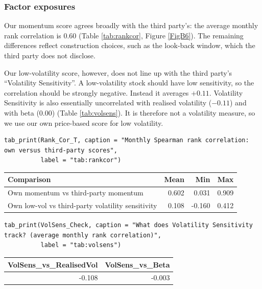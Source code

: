 \documentclass[11pt,preprint]{elsarticle}
\let\origtable\table
\let\endorigtable\endtable
\renewenvironment{table}[1][2] {
    \expandafter\origtable\expandafter[H]
} {
    \endorigtable
}
\numberwithin{equation}{section}
\numberwithin{figure}{section}
\numberwithin{table}{section}
\begin{document}
\subsubsection{Factor exposures}\label{factor-exposures}

Our momentum score agrees broadly with the third party's: the average
monthly rank correlation is 0.60 (Table \ref{tab:rankcor}, Figure
\ref{FigB6}). The remaining differences reflect construction choices,
such as the look-back window, which the third party does not disclose.

Our low-volatility score, however, does not line up with the third
party's ``Volatility Sensitivity''. A low-volatility stock should have
low sensitivity, so the correlation should be strongly negative. Instead
it averages \(+0.11\). Volatility Sensitivity is also essentially
uncorrelated with realised volatility (\(-0.11\)) and with beta (0.00)
(Table \ref{tab:volsens}). It is therefore not a volatility measure, so
we use our own price-based score for low volatility.

\begin{verbatim}
tab_print(Rank_Cor_T, caption = "Monthly Spearman rank correlation: own versus third-party scores",
          label = "tab:rankcor")
\end{verbatim}

\begin{table}[!htbp]
\centering
\caption{Monthly Spearman rank correlation: own versus third-party scores} 
\label{tab:rankcor}
\begingroup\footnotesize
\begin{tabular}{lrrr}
  \hline
Comparison & Mean & Min & Max \\ 
  \hline
Own momentum vs third-party momentum & 0.602 & 0.031 & 0.909 \\ 
  Own low-vol vs third-party volatility sensitivity & 0.108 & -0.160 & 0.412 \\ 
   \hline
\end{tabular}
\endgroup
\end{table}

\begin{verbatim}
tab_print(VolSens_Check, caption = "What does Volatility Sensitivity track? (average monthly rank correlation)",
          label = "tab:volsens")
\end{verbatim}

\begin{table}[!htbp]
\centering
\caption{What does Volatility Sensitivity track? (average monthly rank correlation)} 
\label{tab:volsens}
\begingroup\footnotesize
\begin{tabular}{rr}
  \hline
VolSens\_vs\_RealisedVol & VolSens\_vs\_Beta \\ 
  \hline
-0.108 & -0.003 \\ 
   \hline
\end{tabular}
\endgroup
\end{table}
\end{document}
